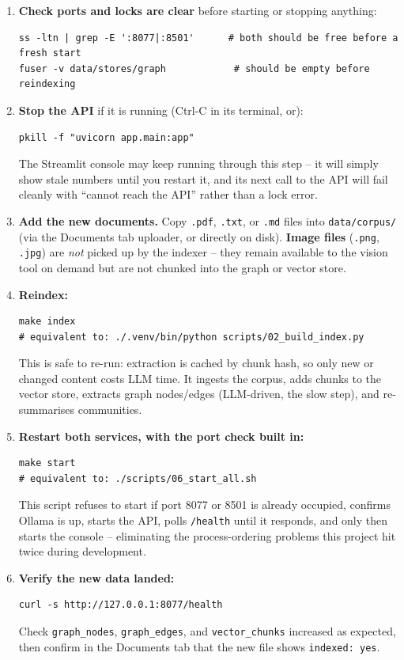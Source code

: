 \documentclass[11pt,a4paper]{article}
\newcommand{\code}[1]{\texttt{\small #1}}
\newcommand{\term}[1]{\textbf{\color{accent}#1}}
\begin{document}
\begin{enumerate}
  \item \textbf{Check ports and locks are clear} before starting or stopping
        anything:
\begin{lstlisting}[style=sh]
ss -ltn | grep -E ':8077|:8501'      # both should be free before a fresh start
fuser -v data/stores/graph            # should be empty before reindexing
\end{lstlisting}
  \item \textbf{Stop the API} if it is running (Ctrl-C in its terminal, or):
\begin{lstlisting}[style=sh]
pkill -f "uvicorn app.main:app"
\end{lstlisting}
        The Streamlit console may keep running through this step -- it will
        simply show stale numbers until you restart it, and its next call to
        the API will fail cleanly with ``cannot reach the API'' rather than a
        lock error.
  \item \textbf{Add the new documents.} Copy \code{.pdf}, \code{.txt}, or
        \code{.md} files into \code{data/corpus/} (via the Documents tab
        uploader, or directly on disk). \term{Image files} (\code{.png},
        \code{.jpg}) are \emph{not} picked up by the indexer -- they remain
        available to the vision tool on demand but are not chunked into the
        graph or vector store.
  \item \textbf{Reindex:}
\begin{lstlisting}[style=sh]
make index
# equivalent to: ./.venv/bin/python scripts/02_build_index.py
\end{lstlisting}
        This is safe to re-run: extraction is cached by chunk hash, so only
        new or changed content costs LLM time. It ingests the corpus, adds
        chunks to the vector store, extracts graph nodes/edges (LLM-driven,
        the slow step), and re-summarises communities.
  \item \textbf{Restart both services, with the port check built in:}
\begin{lstlisting}[style=sh]
make start
# equivalent to: ./scripts/06_start_all.sh
\end{lstlisting}
        This script refuses to start if port 8077 or 8501 is already
        occupied, confirms Ollama is up, starts the API, polls
        \code{/health} until it responds, and only then starts the console --
        eliminating the process-ordering problems this project hit twice
        during development.
  \item \textbf{Verify the new data landed:}
\begin{lstlisting}[style=sh]
curl -s http://127.0.0.1:8077/health
\end{lstlisting}
        Check \code{graph\_nodes}, \code{graph\_edges}, and
        \code{vector\_chunks} increased as expected, then confirm in the
        Documents tab that the new file shows \code{indexed: yes}.
\end{enumerate}
\end{document}

